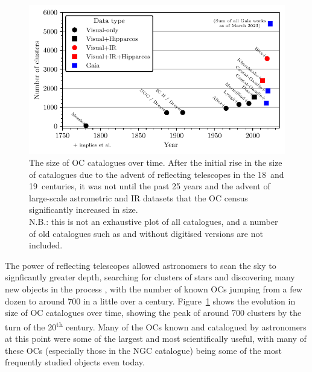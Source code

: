 \begin{figure}[tb]
	\includegraphics[width=\textwidth]{fig/c1/catalogues.pdf}
	\caption[The size of OC catalogues over time.]{The size of OC catalogues over time. After the initial rise in the size of catalogues due to the advent of reflecting telescopes in the 18\third\ and 19\third\ centuries, it was not until the past 25 years and the advent of large-scale astrometric and IR datasets that the OC census significantly increased in size. \\
	{\footnotesize N.B.: this is not an exhaustive plot of all catalogues, and a number of old catalogues such as \cite{herschel_catalogue_one_1786} and \cite{herschel_general_catalogue_1864} without digitised versions are not included.}}
	\label{fig:intro:history:catalogues}
\end{figure}

The power of reflecting telescopes allowed astronomers to scan the sky to signficantly greater depth, searching for clusters of stars and discovering many new objects in the process \citep[e.g.][]{herschel_catalogue_one_1786}, with the number of known OCs jumping from a few dozen to around 700 in a little over a century. Figure~\ref{fig:intro:history:catalogues} shows the evolution in size of OC catalogues over time, showing the peak of around 700 clusters by the turn of the 20\textsuperscript{th} century. Many of the OCs known and catalogued by astronomers at this point were some of the largest and most scientifically useful, with many of these OCs (especially those in the NGC catalogue) being some of the most frequently studied objects even today. 

